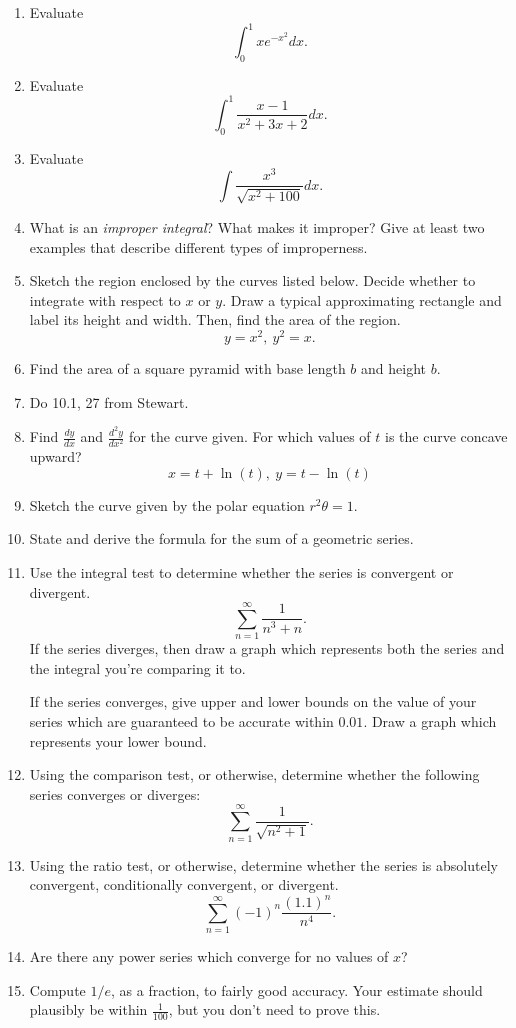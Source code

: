 \documentclass[12pt]{article}
\begin{document}
\begin{enumerate}[(1)]
\item
Evaluate
\[
\int_0^1 x e^{-x^2} dx.
\]
\item
Evaluate
\[
\int_0^1 \frac{x - 1}{x^2 + 3x + 2} dx.
\]
\item
Evaluate
\[
\int \frac{x^3}{\sqrt{x^2 + 100}} dx.
\]

\item
What is an {\itshape improper integral}? What makes it improper? Give at least two examples that
describe different types of improperness.
\item
Sketch the region enclosed by the curves listed below. Decide whether to integrate with
respect to $x$ or $y$. Draw a typical approximating rectangle and label its height and width. Then,
find the area of the region.
\[
y = x^2, \ y^2 = x.
\]
\item
Find the area of a square pyramid with base length $b$ and height $b$.
\item
Do 10.1, 27 from Stewart.
\item
Find $\frac{dy}{dx}$ and $\frac{d^2 y}{dx^2}$ for the curve given. For which values of $t$ is
the curve concave upward?
\[
x = t + \ln(t), \ y = t - \ln(t)
\]
\item
Sketch the curve given by the polar equation $r^2 \theta = 1$.
\item
State and derive the formula for the sum of a geometric series.
\item
Use the integral test to determine whether the series is convergent or divergent.
\[
\sum_{n = 1}^{\infty} \frac{1}{n^3 + n}.
\]
If the series diverges, then draw a graph which
represents both the series and the integral you’re comparing it to.

If the series converges, give upper and lower bounds on the value of your series
which are guaranteed to be accurate within $0.01$. Draw a graph which represents your
lower bound.
\item
Using the comparison test, or otherwise, determine whether the following series converges or diverges:
\[
\sum_{n = 1}^{\infty} \frac{1}{\sqrt{n^2 + 1}}.
\]
\item
Using the ratio test, or otherwise, determine whether the series is absolutely convergent, conditionally
convergent, or divergent.
\[
\sum_{n = 1}^{\infty} (-1)^n \frac{ (1.1)^n }{n^4}.
\]
\item
Are there any power series which converge for no values of $x$?
\item
Compute $1/e$, as a fraction, to fairly good accuracy. Your estimate should plausibly be within $\frac{1}{100}$,
but you don't need to prove this.

\end{enumerate}
\end{document}
